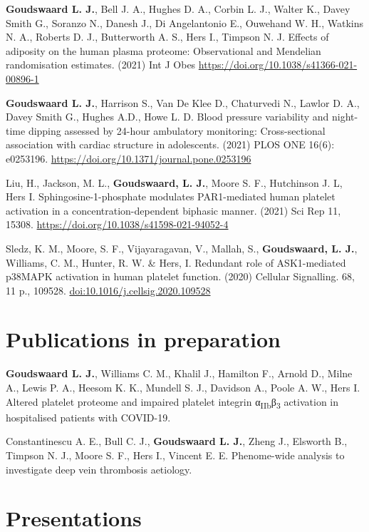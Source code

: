 \documentclass[11pt,twoside]{bristolthesis}
\begin{document}
\textbf{Goudswaard L. J.}, Bell J. A., Hughes D. A., Corbin L. J., Walter K., Davey Smith G., Soranzo N., Danesh J., Di Angelantonio E., Ouwehand W. H., Watkins N. A., Roberts D. J., Butterworth A. S., Hers I., Timpson N. J. Effects of adiposity on the human plasma proteome: Observational and Mendelian randomisation estimates. (2021) Int J Obes \url{https://doi.org/10.1038/s41366-021-00896-1}

\textbf{Goudswaard L. J.}, Harrison S., Van De Klee D., Chaturvedi N., Lawlor D. A., Davey Smith G., Hughes A.D., Howe L. D. Blood pressure variability and night-time dipping assessed by 24-hour ambulatory monitoring: Cross-sectional association with cardiac structure in adolescents. (2021) PLOS ONE 16(6): e0253196. \url{https://doi.org/10.1371/journal.pone.0253196}

Liu, H., Jackson, M. L., \textbf{Goudswaard, L. J.}, Moore S. F., Hutchinson J. L, Hers I. Sphingosine-1-phosphate modulates PAR1-mediated human platelet activation in a concentration-dependent biphasic manner. (2021) Sci Rep 11, 15308. \url{https://doi.org/10.1038/s41598-021-94052-4}

Sledz, K. M., Moore, S. F., Vijayaragavan, V., Mallah, S., \textbf{Goudswaard, L. J.}, Williams, C. M., Hunter, R. W. \& Hers, I. Redundant role of ASK1-mediated p38MAPK activation in human platelet function. (2020) Cellular Signalling. 68, 11 p., 109528. \url{doi:10.1016/j.cellsig.2020.109528}

\hypertarget{publications-in-preparation}{%
\section{Publications in preparation}\label{publications-in-preparation}}

\textbf{Goudswaard L. J.}, Williams C. M., Khalil J., Hamilton F., Arnold D., Milne A., Lewis P. A., Heesom K. K., Mundell S. J., Davidson A., Poole A. W., Hers I. Altered platelet proteome and impaired platelet integrin α\textsubscript{IIb}β\textsubscript{3} activation in hospitalised patients with COVID-19.

Constantinescu A. E., Bull C. J., \textbf{Goudswaard L. J.}, Zheng J., Elsworth B., Timpson N. J., Moore S. F., Hers I., Vincent E. E. Phenome-wide analysis to investigate deep vein thrombosis aetiology.

\hypertarget{presentations}{%
\section{Presentations}\label{presentations}}
\end{document}
